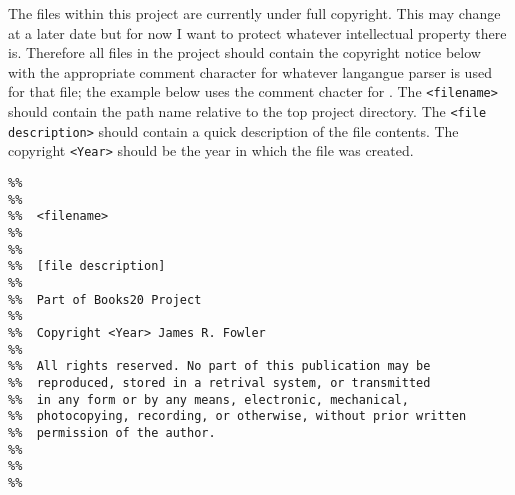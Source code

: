 
The files within this project are currently under full copyright.  This
may change at a later date but for now I want to protect whatever
intellectual property there is.  Therefore all files in the project
should contain the copyright notice below with the appropriate comment
character for whatever langangue parser is used for that file; the
example below uses the comment chacter for \LaTeXe.  The
\texttt{<filename>} should contain the path name relative to the top
project directory. The \texttt{<file description>} should contain a
quick description of the file contents. The copyright \texttt{<Year>}
should be the year in which the file was created.

\begin{verbatim}
%%
%%
%%  <filename>
%%
%%  
%%  [file description]
%%
%%  Part of Books20 Project
%%
%%  Copyright <Year> James R. Fowler
%%
%%  All rights reserved. No part of this publication may be
%%  reproduced, stored in a retrival system, or transmitted
%%  in any form or by any means, electronic, mechanical,
%%  photocopying, recording, or otherwise, without prior written
%%  permission of the author.
%%
%%
%%
\end{verbatim}
